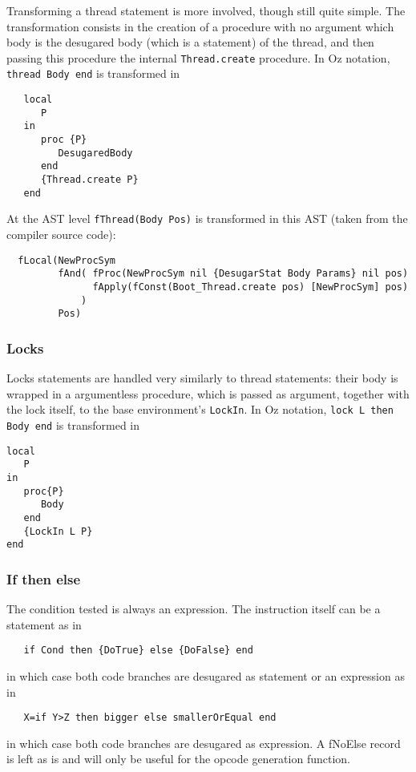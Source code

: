 \documentclass[a4paper]{memoir}
\begin{document}
Transforming a thread statement is more involved, though still quite simple. The transformation consists in the creation of a procedure with no argument which body is the desugared body (which is a statement) of the thread, and then passing this procedure the internal \lstinline!Thread.create! procedure.
In Oz notation, \lstinline!thread Body end! is transformed in 
\begin{lstlisting}
   local 
      P 
   in 
      proc {P} 
         DesugaredBody 
      end 
      {Thread.create P}
   end
\end{lstlisting}
At the AST level \lstinline!fThread(Body Pos)! is transformed in this AST (taken from the compiler source code):
\begin{lstlisting}
  fLocal(NewProcSym 
         fAnd( fProc(NewProcSym nil {DesugarStat Body Params} nil pos) 
               fApply(fConst(Boot_Thread.create pos) [NewProcSym] pos)
             ) 
         Pos)
\end{lstlisting}

\subsubsection{Locks}
Locks statements are handled very similarly to thread statements: their body is
wrapped in a argumentless procedure, which is passed as argument, together with
the lock itself, to the base environment's \lstinline!LockIn!. In Oz notation, \lstinline!lock L then Body end! is transformed in
\begin{lstlisting}
local
   P
in
   proc{P}
      Body
   end
   {LockIn L P}
end
\end{lstlisting}


\subsubsection{If then else}
The condition tested is always an expression.
The instruction itself can be a statement as in 
\begin{lstlisting}
   if Cond then {DoTrue} else {DoFalse} end
\end{lstlisting}
in which case both code branches are desugared as statement
or an expression as in
\begin{lstlisting}
   X=if Y>Z then bigger else smallerOrEqual end
\end{lstlisting}
in which case both code branches are desugared as expression.
A fNoElse record is left as is and will only be useful for the opcode generation function.
\end{document}
